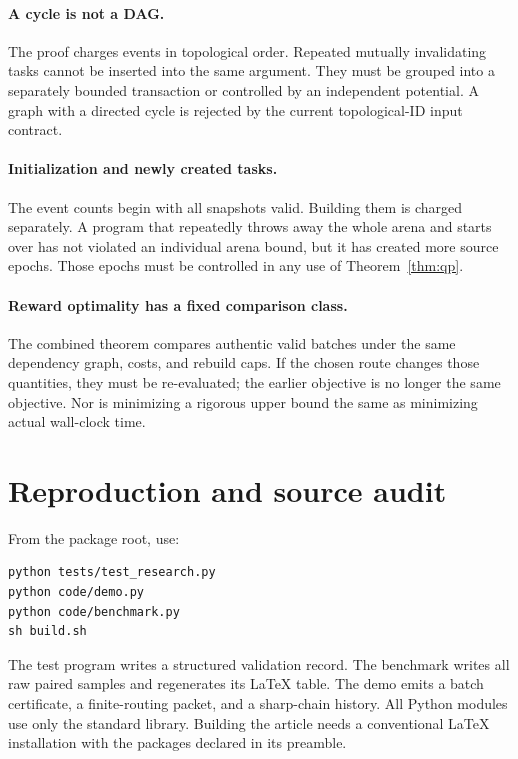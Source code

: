 \documentclass[11pt]{article}
\theoremstyle{definition}
\begin{document}
\paragraph{A cycle is not a DAG.}
The proof charges events in topological order. Repeated mutually invalidating tasks cannot be inserted into the same argument. They must be grouped into a separately bounded transaction or controlled by an independent potential. A graph with a directed cycle is rejected by the current topological-ID input contract.

\paragraph{Initialization and newly created tasks.}
The event counts begin with all snapshots valid. Building them is charged separately. A program that repeatedly throws away the whole arena and starts over has not violated an individual arena bound, but it has created more source epochs. Those epochs must be controlled in any use of Theorem~\ref{thm:qp}.

\paragraph{Reward optimality has a fixed comparison class.}
The combined theorem compares authentic valid batches under the same dependency graph, costs, and rebuild caps. If the chosen route changes those quantities, they must be re-evaluated; the earlier objective is no longer the same objective. Nor is minimizing a rigorous upper bound the same as minimizing actual wall-clock time.

\section{Reproduction and source audit}\label{app:reproduction}
From the package root, use:
\begin{lstlisting}
python tests/test_research.py
python code/demo.py
python code/benchmark.py
sh build.sh
\end{lstlisting}
The test program writes a structured validation record. The benchmark writes all raw paired samples and regenerates its LaTeX table. The demo emits a batch certificate, a finite-routing packet, and a sharp-chain history. All Python modules use only the standard library. Building the article needs a conventional LaTeX installation with the packages declared in its preamble.
\end{document}
